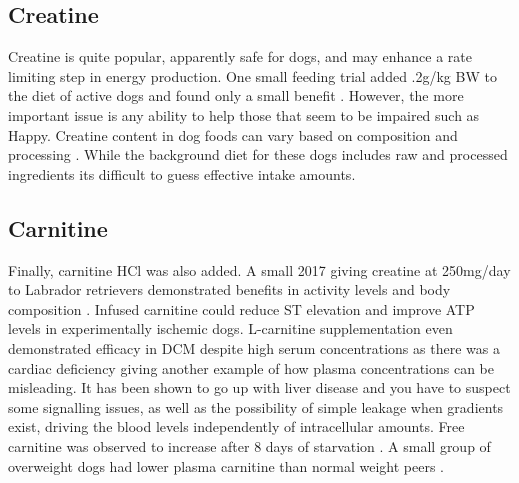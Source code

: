 \subsection{Creatine }
Creatine is quite popular, apparently safe for dogs, and
may enhance a rate limiting step in energy production.
One small feeding trial added .2g/kg BW to the diet of active
dogs and found only a small benefit
\cite{Casini_Liponi_Gatta_effect_creatine_2016}.
However, the more important issue is any ability to 
help those that seem to be impaired such as Happy.
Creatine content in dog foods can vary based on composition
and processing 
\cite{Dobenecker_Braun_Creatine_creatinine_contents_2015}.
While the background diet for these dogs includes raw and
processed ingredients its difficult to guess effective intake amounts.

\subsection{Carnitine }
Finally, carnitine HCl was also added.
A small 2017 giving creatine at  250mg/day to Labrador retrievers
demonstrated benefits in activity levels and body composition
\cite{Varney_Fowler_Gilbert_Utilisation_supplemented_2017}.
Infused carnitine could reduce ST elevation
and improve ATP levels  in experimentally ischemic 
dogs\cite{FOLTS19781209}.
L-carnitine supplementation even demonstrated efficacy in
DCM despite high serum concentrations as there was a cardiac 
deficiency \cite{PMID2019534} giving another example of how
plasma concentrations can be misleading. 
It has been shown to go up with liver disease 
\cite{https://doi.org/10.1111/j.1939-165X.2007.tb00199.x}
and you have to suspect some signalling issues, 
as well as the possibility of simple leakage when gradients
exist, driving the
blood levels independently of intracellular amounts. 
Free carnitine was observed to increase after 8 days of starvation
\cite{Rodriguez_Bruyns_Askanazi_Carnitine_metabolism_during_fasting_1986}.
A small group of overweight dogs had lower plasma carnitine than 
normal weight peers \cite{Söder2019}.


